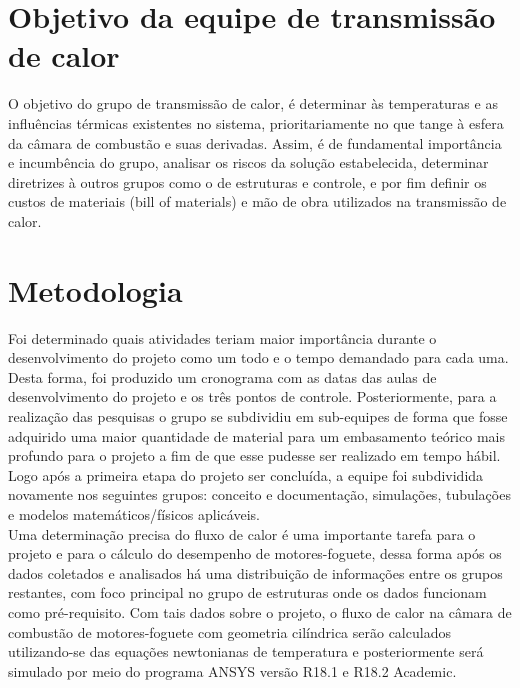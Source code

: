 
\section{Objetivo da equipe de transmissão de calor}
O objetivo do grupo de transmissão de calor, é determinar às temperaturas e as influências térmicas existentes no sistema, prioritariamente no que tange à esfera da câmara de combustão e suas derivadas. Assim, é de fundamental importância e incumbência do grupo, analisar os riscos da solução estabelecida, determinar diretrizes à outros grupos como o de estruturas e controle, e por fim definir os custos de materiais (bill of materials) e mão de obra utilizados na transmissão de calor.
\section{Metodologia}
Foi determinado quais atividades teriam maior importância durante o desenvolvimento do projeto como um todo e o tempo demandado para cada uma. Desta forma, foi produzido um cronograma com as datas das aulas de desenvolvimento do projeto e os três pontos de controle. Posteriormente, para a realização das pesquisas o grupo se subdividiu em sub-equipes de forma que fosse adquirido uma maior quantidade de material para um embasamento teórico mais profundo para o projeto a fim de que esse pudesse ser realizado em tempo hábil. Logo após a primeira etapa do projeto ser concluída, a equipe foi subdividida novamente nos seguintes grupos: conceito e documentação, simulações, tubulações e modelos matemáticos/físicos aplicáveis.\\
Uma determinação precisa do fluxo de calor é uma importante tarefa para o projeto e para o cálculo do desempenho de motores-foguete, dessa forma após os dados coletados e analisados há uma distribuição de informações entre os grupos restantes, com foco principal no grupo de estruturas onde os dados funcionam como pré-requisito. Com tais dados sobre o projeto, o fluxo de calor na câmara de combustão de motores-foguete com geometria cilíndrica serão calculados utilizando-se das equações newtonianas de temperatura e posteriormente será simulado por meio do programa ANSYS versão R18.1 e  R18.2 Academic. 
